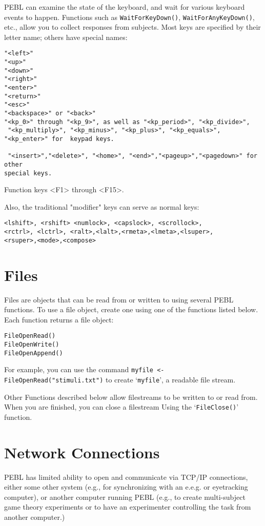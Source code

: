 PEBL can examine the state of the keyboard, and wait for various
keyboard events to happen. Functions such as
\texttt{WaitForKeyDown()}, \texttt{WaitForAnyKeyDown()}, etc., allow
you to collect responses from subjects. Most keys are specified by
their letter name; others have special names:
\begin{verbatim}
"<left>"
"<up>"
"<down>"
"<right>"
"<enter>"
"<return>"
"<esc>"
"<backspace>" or "<back>"
"<kp_0>" through "<kp_9>", as well as "<kp_period>", "<kp_divide>",
 "<kp_multiply>", "<kp_minus>", "<kp_plus>", "<kp_equals>",
"<kp_enter>" for  keypad keys.

 "<insert>","<delete>", "<home>", "<end>","<pageup>","<pagedown>" for other
special keys.
\end{verbatim}

Function keys <F1> through <F15>.

Also, the traditional "modifier" keys can serve as normal keys:


\begin{verbatim}
<lshift>, <rshift> <numlock>, <capslock>, <scrollock>, 
<rctrl>, <lctrl>, <ralt>,<lalt>,<rmeta>,<lmeta>,<lsuper>,
<rsuper>,<mode>,<compose>

\end{verbatim}


\section{Files}

Files are objects that can be read from or written to using several PEBL functions. To use a file object, create one using one of the functions 
listed below.  Each function returns a file object:
\begin{verbatim}
FileOpenRead()
FileOpenWrite()
FileOpenAppend()
\end{verbatim}

For example, you can use the command \texttt{myfile <-
  FileOpenRead("stimuli.txt")} 
to create `\texttt{myfile}', a readable
file stream.


Other Functions described below allow filestreams to be written to 
or read from.  When you are finished, you can close a filestream 
Using the `\texttt{FileClose()}' function.


\section{Network Connections}

PEBL has limited ability to open and communicate via  TCP/IP
connections, either some other system (e.g., for synchronizing with an
e.e.g. or eyetracking computer), or another computer running PEBL
(e.g., to create multi-subject game theory experiments or to have an
experimenter controlling the task from another computer.)

